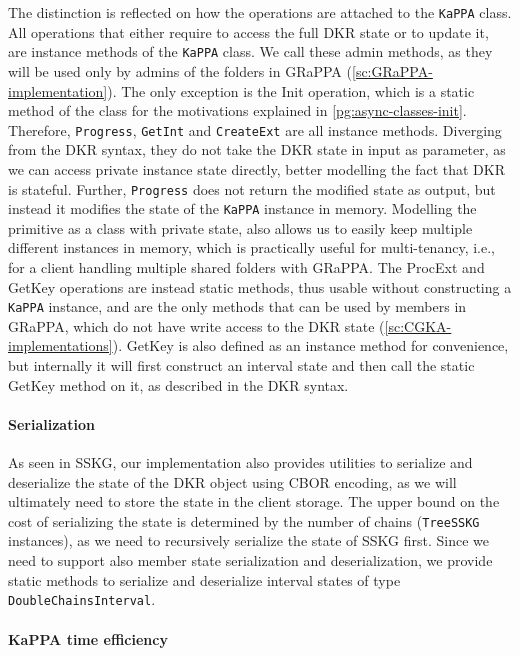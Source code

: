 The distinction is reflected on how the operations are attached
to the \texttt{KaPPA} class. All operations that either require
to access the full DKR state or to update it, are instance
methods of the \texttt{KaPPA} class. We call these admin methods,
as they will be used only by admins of the folders in GRaPPA (\cref{sc:GRaPPA-implementation}).
The only exception is the Init operation, which is a static method 
of the class for the motivations explained in \cref{pg:async-classes-init}.
Therefore, \texttt{Progress}, \texttt{GetInt} and \texttt{CreateExt} are all instance methods.
Diverging from the DKR syntax, they do not take the DKR state in input
as parameter, as we can access private instance state directly,
better modelling the fact that DKR is stateful.
Further, \texttt{Progress} does not return the modified state as output, 
but instead it modifies the state of the \texttt{KaPPA} instance in memory.
Modelling the primitive as a class with private state, also
allows us to easily keep multiple different instances
in memory, which is practically useful for multi-tenancy, i.e., 
for a client handling multiple shared folders with GRaPPA.
The ProcExt and GetKey operations are instead static methods,
thus usable without constructing a \texttt{KaPPA} instance,
and are the only methods that can be used by members in GRaPPA,
which do not have write access to the DKR state (\cref{sc:CGKA-implementations}).
GetKey is also defined as an instance method for convenience,
but internally it will first construct an interval state and
then call the static GetKey method on it, as described in the
DKR syntax.

\paragraph{Serialization} As seen in SSKG, our implementation also provides utilities
to serialize and deserialize the state of the DKR object
using CBOR encoding, as we will ultimately need to
store the state in the client storage.
The upper bound on the cost of serializing the state is determined
by the number of chains (\texttt{TreeSSKG} instances),
as we need to recursively serialize the state of SSKG first.
Since we need to support also member state serialization and deserialization,
we provide static methods to serialize and deserialize interval
states of type \texttt{DoubleChainsInterval}.

\paragraph{KaPPA time efficiency}

